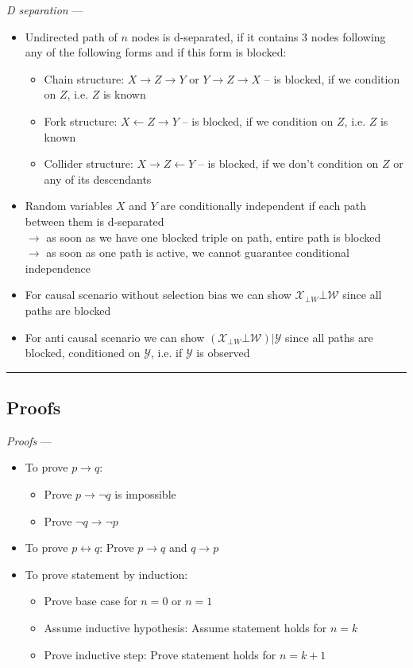 \emph{D separation} --- 
\begin{itemize}
    \item Undirected path of $n$ nodes is d-separated, if it contains 3 nodes following any of the following forms and if this form is blocked: 
    \begin{itemize}
        \item Chain structure: $X \rightarrow Z \rightarrow Y$ or $Y \rightarrow Z \rightarrow X$ – is blocked, if we condition on $Z$, i.e. $Z$ is known
        \item Fork structure: $X \leftarrow Z \rightarrow Y$ – is blocked, if we condition on $Z$, i.e. $Z$ is known
        \item Collider structure: $X \rightarrow Z \leftarrow Y$ – is blocked, if we don't condition on $Z$ or any of its descendants
    \end{itemize}
    \item Random variables $X$ and $Y$ are conditionally independent if each path between them is d-separated\\
    $\rightarrow$ as soon as we have one blocked triple on path, entire path is blocked\\
    $\rightarrow$ as soon as one path is active, we cannot guarantee conditional independence
    \item For causal scenario without selection bias we can show $\mathcal{X}_{\bot W} \bot \mathcal{W}$ since all paths are blocked 
    \item For anti causal scenario we can show $(\mathcal{X}_{\bot W} \bot \mathcal{W}) | \mathcal{Y}$ since all paths are blocked, conditioned on $\mathcal{Y}$, i.e. if $\mathcal{Y}$ is observed
\end{itemize}

{\color{black}\hrule height 0.001mm}

\subsection*{Proofs}

\emph{Proofs} --- 
\begin{itemize}
    \item To prove $p \rightarrow q$:
    \begin{itemize}
        \item Prove $p \rightarrow \neg q$ is impossible
        \item Prove $\neg q \rightarrow \neg p$
    \end{itemize}
    \item To prove $p \leftrightarrow q$: Prove $p \rightarrow q$ and $q \rightarrow p$
    \item To prove statement by induction: 
    \begin{itemize}
        \item Prove base case for $n=0$ or $n=1$
        \item Assume inductive hypothesis: Assume statement holds for $n=k$
        \item Prove inductive step: Prove statement holds for $n=k+1$
    \end{itemize}
\end{itemize}